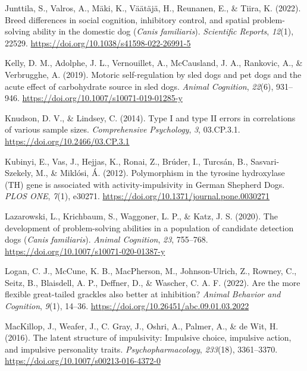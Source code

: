 \documentclass[
  ,pub,floatsintext]{apa6}
\newlength{\cslhangindent}
\newlength{\cslentryspacingunit} %
\newenvironment{CSLReferences}[2] %
 {%
  \setlength{\parindent}{0pt}
  \ifodd #1
  \let\oldpar\par
  \def\par{\hangindent=\cslhangindent\oldpar}
  \fi
  \setlength{\parskip}{#2\cslentryspacingunit}
 }%
 {}
\begin{document}
\begin{CSLReferences}{1}{0}
\leavevmode{}%
Junttila, S., Valros, A., Mäki, K., Väätäjä, H., Reunanen, E., \& Tiira, K. (2022). Breed differences in social cognition, inhibitory control, and spatial problem-solving ability in the domestic dog ({\emph{Canis}}{ \emph{familiaris}}). \emph{Scientific Reports}, \emph{12}(1), 22529. \url{https://doi.org/10.1038/s41598-022-26991-5}

\leavevmode{}%
Kelly, D. M., Adolphe, J. L., Vernouillet, A., McCausland, J. A., Rankovic, A., \& Verbrugghe, A. (2019). Motoric self-regulation by sled dogs and pet dogs and the acute effect of carbohydrate source in sled dogs. \emph{Animal Cognition}, \emph{22}(6), 931--946. \url{https://doi.org/10.1007/s10071-019-01285-y}

\leavevmode{}%
Knudson, D. V., \& Lindsey, C. (2014). Type {I} and type {II} errors in correlations of various sample sizes. \emph{Comprehensive Psychology}, \emph{3}, 03.CP.3.1. \url{https://doi.org/10.2466/03.CP.3.1}

\leavevmode{}%
Kubinyi, E., Vas, J., Hejjas, K., Ronai, Z., Brúder, I., Turcsán, B., Sasvari-Szekely, M., \& Miklósi, Á. (2012). Polymorphism in the tyrosine hydroxylase ({TH}) gene is associated with activity-impulsivity in {German Shepherd Dogs}. \emph{PLOS ONE}, \emph{7}(1), e30271. \url{https://doi.org/10.1371/journal.pone.0030271}

\leavevmode{}%
Lazarowski, L., Krichbaum, S., Waggoner, L. P., \& Katz, J. S. (2020). The development of problem-solving abilities in a population of candidate detection dogs ({\emph{Canis}}{ \emph{familiaris}}). \emph{Animal Cognition}, \emph{23}, 755--768. \url{https://doi.org/10.1007/s10071-020-01387-y}

\leavevmode{}%
Logan, C. J., McCune, K. B., MacPherson, M., Johnson-Ulrich, Z., Rowney, C., Seitz, B., Blaisdell, A. P., Deffner, D., \& Wascher, C. A. F. (2022). Are the more flexible great-tailed grackles also better at inhibition? \emph{Animal Behavior and Cognition}, \emph{9}(1), 14--36. \url{https://doi.org/10.26451/abc.09.01.03.2022}

\leavevmode{}%
MacKillop, J., Weafer, J., C. Gray, J., Oshri, A., Palmer, A., \& de Wit, H. (2016). The latent structure of impulsivity: Impulsive choice, impulsive action, and impulsive personality traits. \emph{Psychopharmacology}, \emph{233}(18), 3361--3370. \url{https://doi.org/10.1007/s00213-016-4372-0}


\end{CSLReferences}
\end{document}

